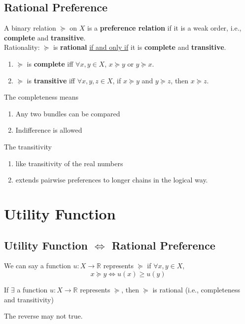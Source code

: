 \documentclass[11pt]{elegantbook}
\begin{document}
\subsection{Rational Preference}
\begin{definition}[Rantional Relation = Preference]
    \normalfont
    A binary relation $\succeq$ on $X$ is a \textbf{preference relation} if it is a weak order, i.e., \textbf{complete} and \textbf{transitive}.\\
    {Rationality}: $\succeq$ is \textbf{rational} \underline{if and only if} it is \textbf{complete} and \textbf{transitive}.
    \begin{enumerate}[$\circ$]
        \item $\succeq$ is \textbf{complete} iff $\forall x,y\in X$, $x \succeq y$ or $y \succeq x$.
        \item $\succeq$ is \textbf{transitive} iff $\forall x, y, z \in X$, if $x \succeq y$ and $y \succeq z$, then $x \succeq z$.
    \end{enumerate}
\end{definition}
The completeness means
\begin{enumerate}[-]
    \item Any two bundles can be compared
    \item Indifference is allowed
\end{enumerate}
The transitivity
\begin{enumerate}[-]
    \item like transitivity of the real numbers
    \item extends pairwise preferences to longer chains in the logical way.
\end{enumerate}


\section{Utility Function}
\subsection{Utility Function $\Leftrightarrow$ Rational Preference}
\begin{definition}
    \normalfont
    We can say a function $u: X \rightarrow \mathbb{R}$ represents $\succeq$ if $\forall x,y\in X$, $$x\succeq y \Leftrightarrow u(x)\geq u(y)$$
\end{definition}

\begin{proposition}
    If $\exists$ a function $u: X \rightarrow \mathbb{R}$ represents $\succeq$, then $\succeq$ is rational (i.e., completeness and transitivity)
\end{proposition}
\begin{note}
    The reverse may not true.
\end{note}
\end{document}
